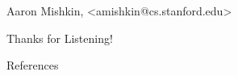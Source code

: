\documentclass[mathserif,notheorems]{beamer}
\title{}
\author{}
\institute{}
\date{}
\def\\{}%
\def\texttt#1{<#1>}%
\begin{document}
        \begin{frame}
        \vspace{1em}
        \begin{center}
            {\Large  \vspace{1em}} %


            {\large  \vspace{1em} } %

            {\large Aaron Mishkin, \\ \texttt{amishkin@cs.stanford.edu} } %
        \end{center}

        \vspace{2em}

        \begin{figure}
            \centering

        \end{figure}

    \end{frame}


    \begin{frame}{}

    \end{frame}



    \begin{frame}{}
        \begin{center}
        \huge Thanks for Listening!
        \end{center}
    \end{frame}

    \begin{frame}[allowframebreaks]{References}
        
        
    \end{frame}
\end{document}
